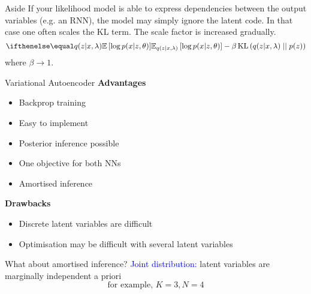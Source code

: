 \documentclass[14pt]{beamer}
\begin{document}
\begin{frame}{Aside}
If your likelihood model is able to express dependencies between the output variables (e.g. an RNN), the model may simply ignore the latent code.
In that case one often scales the KL term. The scale factor is increased gradually.
\begin{equation*}
\E[q(z|x,\lambda)]{\log p(x|z,\theta)} - \beta \KL{q(z|x,\lambda)}{p(z)}
\end{equation*}
where $ \beta \rightarrow 1 $.
\end{frame}

\begin{frame}{Variational Autoencoder}
\textbf{Advantages}
\begin{itemize}
\item Backprop training
\item Easy to implement
\item Posterior inference possible
\item One objective for both NNs
\item Amortised inference
\end{itemize}
\pause
\textbf{Drawbacks}
\begin{itemize}
\item Discrete latent variables are difficult
\item Optimisation may be difficult with several latent variables
\end{itemize}
\end{frame}


\begin{frame}{What about amortised inference?}
\textcolor{blue}{Joint distribution:} latent variables are marginally independent a priori\\
$$\text{for example, }K=3, N=4$$
\begin{figure}
\center
{}
\end{figure}

~


\end{frame}
\end{document}
